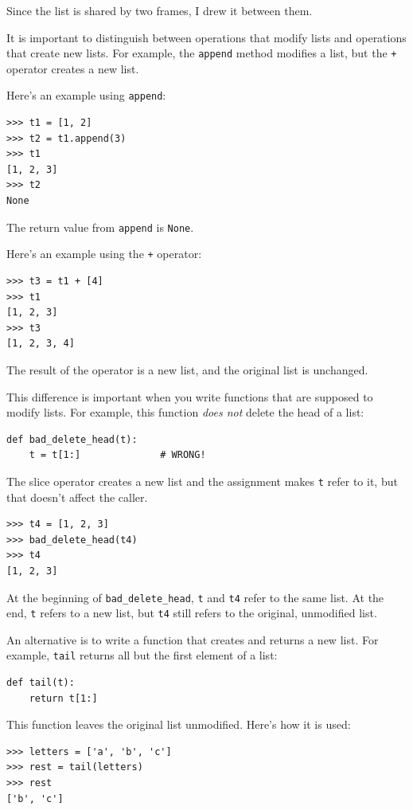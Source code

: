 \documentclass[10pt]{book}
\begin{document}
Since the list is shared by two frames, I drew
it between them.

It is important to distinguish between operations that
modify lists and operations that create new lists.  For
example, the {\tt append} method modifies a list, but the
{\tt +} operator creates a new list.

Here's an example using {\tt append}:
%
\begin{verbatim}
>>> t1 = [1, 2]
>>> t2 = t1.append(3)
>>> t1
[1, 2, 3]
>>> t2
None
\end{verbatim}
%
The return value from {\tt append} is {\tt None}.

Here's an example using the {\tt +} operator:
%
\begin{verbatim}
>>> t3 = t1 + [4]
>>> t1
[1, 2, 3]
>>> t3
[1, 2, 3, 4]
\end{verbatim}
%
The result of the operator is a new list, and the original list is
unchanged.

This difference is important when you write functions that
are supposed to modify lists.  For example, this function
{\em does not} delete the head of a list:
%
\begin{verbatim}
def bad_delete_head(t):
    t = t[1:]              # WRONG!
\end{verbatim}
%
The slice operator creates a new list and the assignment
makes {\tt t} refer to it, but that doesn't affect the caller.
%
\begin{verbatim}
>>> t4 = [1, 2, 3]
>>> bad_delete_head(t4)
>>> t4
[1, 2, 3]
\end{verbatim}
%
At the beginning of \verb"bad_delete_head", {\tt t} and {\tt t4}
refer to the same list.  At the end, {\tt t} refers to a new list,
but {\tt t4} still refers to the original, unmodified list.

An alternative is to write a function that creates and
returns a new list.  For
example, {\tt tail} returns all but the first
element of a list:

\begin{verbatim}
def tail(t):
    return t[1:]
\end{verbatim}
%
This function leaves the original list unmodified.
Here's how it is used:

\begin{verbatim}
>>> letters = ['a', 'b', 'c']
>>> rest = tail(letters)
>>> rest
['b', 'c']
\end{verbatim}
\end{document}
